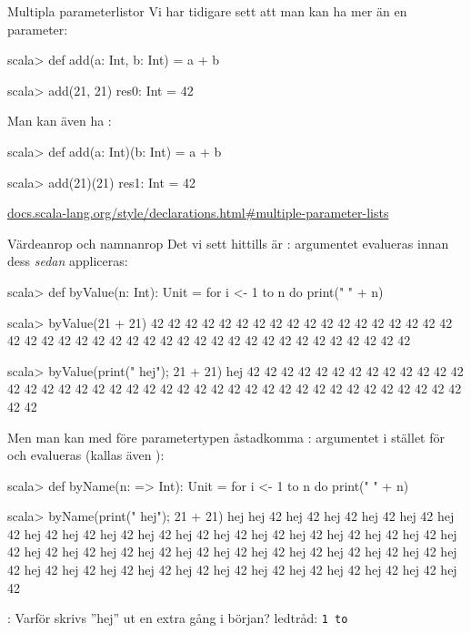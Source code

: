 \begin{Slide}{Multipla parameterlistor}
	Vi har tidigare sett att man kan ha mer än en parameter:
	\begin{REPLnonum}
		scala> def add(a: Int, b: Int) = a + b

		scala> add(21, 21)
		res0: Int = 42
	\end{REPLnonum}
	Man kan även ha  :
	\begin{REPLnonum}
		scala> def add(a: Int)(b: Int) = a + b

		scala> add(21)(21)
		res1: Int = 42
	\end{REPLnonum}

	\href{http://docs.scala-lang.org/style/declarations.html#multiple-parameter-lists}{\SlideFontTiny docs.scala-lang.org/style/declarations.html\#multiple-parameter-lists}
\end{Slide}

\begin{Slide}{Värdeanrop och namnanrop}\SlideFontSmall
	Det vi sett hittills är : argumentet evalueras  innan dess  \emph{sedan} appliceras:
	\begin{REPL}
		scala> def byValue(n: Int): Unit = for i <- 1 to n do print(" " + n)

		scala> byValue(21 + 21)
		42 42 42 42 42 42 42 42 42 42 42 42 42 42 42 42 42 42 42 42 42 42 42 42 42 42 42 42 42 42 42 42 42 42 42 42 42 42 42 42 42 42

		scala> byValue({print(" hej"); 21 + 21})
		hej 42 42 42 42 42 42 42 42 42 42 42 42 42 42 42 42 42 42 42 42 42 42 42 42 42 42 42 42 42 42 42 42 42 42 42 42 42 42 42 42 42 42
	\end{REPL}
	\pause
	Men man kan med \code{=>} före parametertypen åstadkomma : argumentet  i stället för  och evalueras  (kallas även ):
	\begin{REPL}
		scala> def byName(n: => Int): Unit = for i <- 1 to n do print(" " + n)

		scala> byName({print(" hej"); 21 + 21})
		hej hej 42 hej 42 hej 42 hej 42 hej 42 hej 42 hej 42 hej 42 hej 42 hej 42 hej 42 hej 42 hej 42 hej 42 hej 42 hej 42 hej 42 hej 42 hej 42 hej 42 hej 42 hej 42 hej 42 hej 42 hej 42 hej 42 hej 42 hej 42 hej 42 hej 42 hej 42 hej 42 hej 42 hej 42 hej 42 hej 42 hej 42 hej 42 hej 42 hej 42 hej 42 hej 42
	\end{REPL}
	: Varför skrivs ''hej'' ut en extra gång i början? \pause ledtråd: \texttt{1 to }
\end{Slide}

